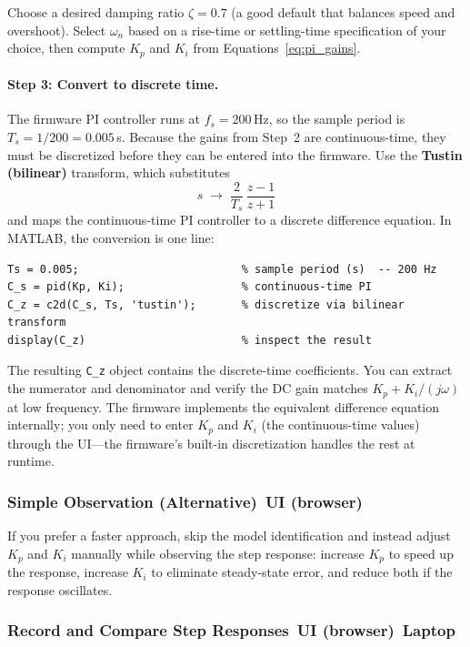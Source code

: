 \documentclass{ol-softwaremanual}
\newcommand{\onlaptop}{%
  \,\colorbox{green!25}{\footnotesize\sffamily\bfseries Laptop}}
\newcommand{\onui}{%
  \,\colorbox{yellow!50}{\footnotesize\sffamily\bfseries UI (browser)}}
\begin{document}
Choose a desired damping ratio $\zeta = 0.7$ (a good default that balances speed and
overshoot).
Select $\omega_n$ based on a rise-time or settling-time specification of your choice,
then compute $K_p$ and $K_i$ from Equations~\eqref{eq:pi_gains}.

\paragraph{Step 3: Convert to discrete time.}
The firmware PI controller runs at $f_s = 200$\,Hz, so the sample period is
$T_s = 1/200 = 0.005$\,s.
Because the gains from Step~2 are continuous-time, they must be discretized before
they can be entered into the firmware.
Use the \textbf{Tustin (bilinear)} transform, which substitutes
\[
  s \;\longrightarrow\; \frac{2}{T_s}\,\frac{z-1}{z+1}
\]
and maps the continuous-time PI controller to a discrete difference equation.
In MATLAB, the conversion is one line:

\begin{verbatim}
Ts = 0.005;                         % sample period (s)  -- 200 Hz
C_s = pid(Kp, Ki);                  % continuous-time PI
C_z = c2d(C_s, Ts, 'tustin');       % discretize via bilinear transform
display(C_z)                        % inspect the result
\end{verbatim}

The resulting \texttt{C\_z} object contains the discrete-time coefficients.
You can extract the numerator and denominator and verify the DC gain matches
$K_p + K_i / (j\omega)$ at low frequency.
The firmware implements the equivalent difference equation internally;
you only need to enter $K_p$ and $K_i$ (the continuous-time values) through
the UI---the firmware's built-in discretization handles the rest at runtime.

\subsubsection{Simple Observation (Alternative)\onui}\label{ssec:simple-obs}

If you prefer a faster approach, skip the model identification and instead adjust
$K_p$ and $K_i$ manually while observing the step response:
increase $K_p$ to speed up the response, increase $K_i$ to eliminate steady-state
error, and reduce both if the response oscillates.

\subsubsection{Record and Compare Step Responses\onui\onlaptop}
\end{document}
